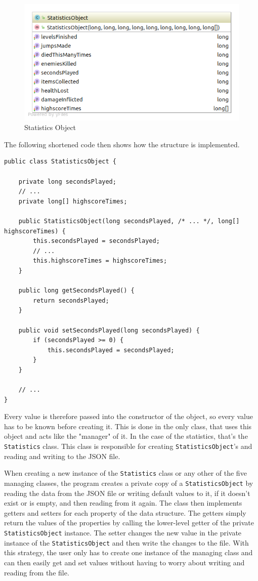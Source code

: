 \documentclass[12p]{article}
\begin{document}
\begin{figure}[ht]
  \center
  \includegraphics[width=1\textwidth]{Documentation/StatisticsObject.png}
  \caption{Statistics Object}
  \label{fig:StatisticsObjectUML}
\end{figure}

The following shortened code then shows how the structure is implemented.

\begin{verbatim}
public class StatisticsObject {

    private long secondsPlayed;
    // ...
    private long[] highscoreTimes;
    
    public StatisticsObject(long secondsPlayed, /* ... */, long[] highscoreTimes) {
        this.secondsPlayed = secondsPlayed;
        // ...
        this.highscoreTimes = highscoreTimes;
    }
    
    public long getSecondsPlayed() {
        return secondsPlayed;
    }

    public void setSecondsPlayed(long secondsPlayed) {
        if (secondsPlayed >= 0) {
            this.secondsPlayed = secondsPlayed;
        }
    }
    
    // ...
}
\end{verbatim}

Every value is therefore passed into the constructor of the object, so every value has to be known before creating it. This is done in the only class, that uses this object and acts like the "manager" of it. In the case of the statistics, that's the \texttt{Statistics} class. This class is responsible for creating \texttt{StatisticsObject}'s and reading and writing to the JSON file.

When creating a new instance of the \texttt{Statistics} class or any other of the five managing classes, the program creates a private copy of a \texttt{StatisticsObject} by reading the data from the JSON file or writing default values to it, if it doesn't exist or is empty, and then reading from it again. The class then implements getters and setters for each property of the data structure. The getters simply return the values of the properties by calling the lower-level getter of the private \texttt{StatisticsObject} instance. The setter changes the new value in the private instance of the \texttt{StatisticsObject} and then write the changes to the file. With this strategy, the user only has to create one instance of the managing class and can then easily get and set values without having to worry about writing and reading from the file.
\end{document}
